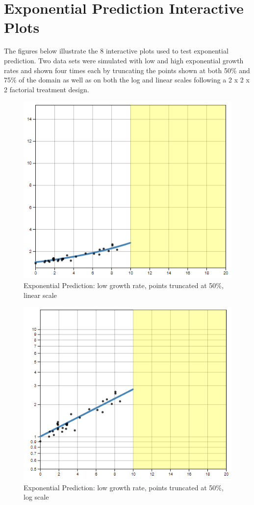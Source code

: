 \documentclass[print]{nuthesis}
\begin{document}
\hypertarget{exponential-prediction-plots}{%
\chapter{Exponential Prediction Interactive Plots}\label{exponential-prediction-plots}}

The figures below illustrate the 8 interactive plots used to test exponential prediction.
Two data sets were simulated with low and high exponential growth rates and shown four times each by truncating the points shown at both 50\% and 75\% of the domain as well as on both the log and linear scales following a 2 x 2 x 2 factorial treatment design.

\begin{figure}[tbp]

{\centering \includegraphics[width=0.65\linewidth,]{images/low-10-linear} 

}

\caption{Exponential Prediction: low growth rate, points truncated at 50\%, linear scale}\label{fig:low-10-linear}
\end{figure}

\begin{figure}[tbp]

{\centering \includegraphics[width=0.65\linewidth,]{images/low-10-log} 

}

\caption{Exponential Prediction: low growth rate, points truncated at 50\%, log scale}\label{fig:low-10-log}
\end{figure}
\end{document}
